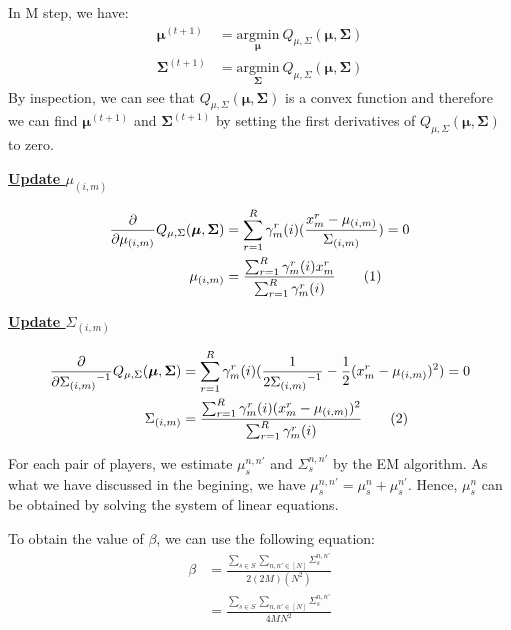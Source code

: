 \documentclass[12pt]{article}
\newcommand\numberthis{\addtocounter{equation}{1}\tag{\theequation}}
\newenvironment{problem}[2][Problem]{\begin{trivlist}
\item[\hskip \labelsep {\bfseries #1}\hskip \labelsep {\bfseries #2.}]}{\end{trivlist}}
\begin{document}
\begin{problem}{2.6.18}
In M step, we have:
\begin{align*}
    \bm{\mu}^{(t+1)} 
        &= \underset{\bm{\mu}}{\mathrm{argmin}} ~ Q_{\mu, \Sigma}(\bm{\mu}, \bm{\Sigma})  \\
    \bm{\Sigma}^{(t+1)} 
        &= \underset{\bm{\Sigma}}{\mathrm{argmin}} ~ Q_{\mu, \Sigma}(\bm{\mu}, \bm{\Sigma}) 
\end{align*}
By inspection, we can see that $Q_{\mu, \Sigma}(\bm{\mu}, \bm{\Sigma})$ 
is a convex function and therefore
we can find $\bm{\mu}^{(t+1)}$ and $\bm{\Sigma}^{(t+1)}$ 
by setting the first derivatives of $Q_{\mu, \Sigma}(\bm{\mu}, \bm{\Sigma})$
to zero.

\begin{flushleft}
    \textbf{\underline{Update $\mu_{(i,m)}$}}
\end{flushleft}

\begin{align*}
    \frac{\partial}{\partial \mu_{(i,m)}}Q_{\mu, \Sigma}(\bm{\mu}, \bm{\Sigma}) 
    &= \sum_{r=1}^{R} \gamma^{r}_{m}(i)(\frac{x^r_m - \mu_{(i,m)}}{\Sigma_{(i,m)}}) = 0 \\
    \mu_{(i,m)}
    &= \frac{\sum_{r=1}^{R}\gamma^{r}_{m}(i)x^r_m}{\sum_{r=1}^{R}\gamma^{r}_{m}(i)}
            \numberthis \label{eq:Q26-updateMu}
\end{align*}

\begin{flushleft}
    \textbf{\underline{Update $\Sigma_{(i,m)}$}}
\end{flushleft}

\begin{align*}
    \frac{\partial}{\partial {\Sigma_{(i,m)}}^{-1}}Q_{\mu, \Sigma}(\bm{\mu}, \bm{\Sigma}) 
    &= \sum_{r=1}^{R} \gamma^{r}_{m}(i)(\frac{1}{2{\Sigma_{(i,m)}}^{-1}} - \frac{1}{2}(x^r_m - \mu_{(i,m)})^2) = 0 \\
    \Sigma_{(i,m)}
    &= \frac{\sum_{r=1}^{R}\gamma^{r}_{m}(i)(x^r_m - \mu_{(i,m)})^2}
            {\sum_{r=1}^{R}\gamma^{r}_{m}(i)}  \numberthis \label{eq:Q26-updateSigma}
\end{align*}

For each pair of players, we estimate $\mu_s^{n,n'}$ and $\Sigma_s^{n,n'}$ by the
EM algorithm.
As what we have discussed in the begining, we have $\mu_s^{n,n'} = \mu_s^{n} + \mu_s^{n'}$.
Hence, $\mu_s^{n}$ can be obtained by solving the system of linear equations.

To obtain the value of $\beta$, we can use the following equation:
\begin{align*}
    \beta &= \frac{\sum_{s \in S}\sum_{n, n' \in [N]}\Sigma_s^{n,n'}}{2(2M)(N^2)} \\
    &= \frac{\sum_{s \in S}\sum_{n, n' \in [N]}\Sigma_s^{n,n'}}{4 M N^2} \\
\end{align*}
\end{problem}
\end{document}
